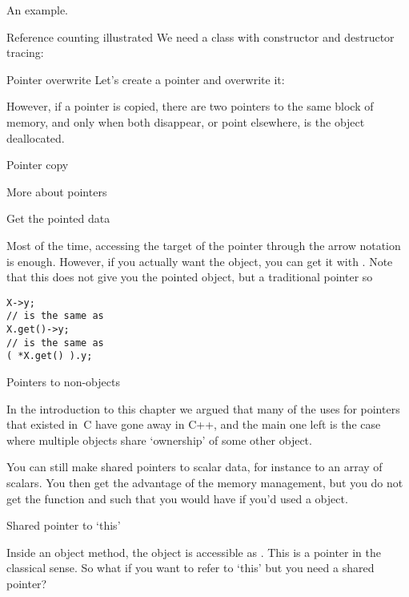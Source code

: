An example.

\begin{block}{Reference counting illustrated}
  \label{sl:construct-destruct-trace}
  We need a class with constructor and destructor tracing:
\end{block}

\begin{block}{Pointer overwrite}
  \label{sl:shared-ptr-overwrite}
  Let's create a pointer and overwrite it:
\end{block}

However, if a pointer is copied, there are two pointers to the same
block of memory, and only when both disappear, or point elsewhere, is
the object deallocated.

\begin{block}{Pointer copy}
  \label{sl:shared-ptr-copy}
\end{block}

 {More about pointers}

 {Get the pointed data}

Most of the time, accessing the target of the pointer through the
arrow notation is enough. However, if you actually want the object,
you can get it with . Note that this does not give
you the pointed object, but a traditional pointer so 
\begin{verbatim}
X->y;
// is the same as
X.get()->y;
// is the same as
( *X.get() ).y;
\end{verbatim}


 {Pointers to non-objects}

In the introduction to this chapter we argued that many of the uses
for pointers that existed in~C have gone away in C++, and the main one
left is the case where multiple objects share `ownership' of some
other object.

You can still make shared pointers to scalar data, for instance to an
array of scalars. You then get the advantage of the memory management,
but you do not get the  function and such that you would have
if you'd used a  object.
%

 {Shared pointer to `this'}

Inside an object method, the object is accessible as
. This is a pointer in the classical sense. So what
if you want to refer to `this' but you need a shared pointer?

